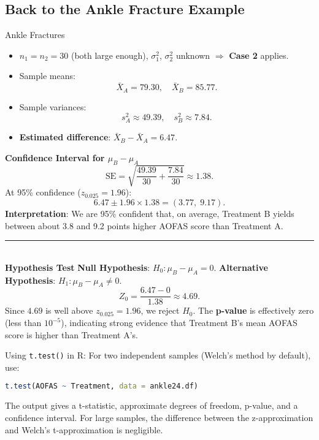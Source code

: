 \documentclass[10pt, total={6in, 8in}]{extarticle}
\begin{document}
\subsection{Back to the Ankle Fracture Example}
\begin{examplebox}{Ankle Fractures}{}
    \begin{itemize}
        \item $n_1 = n_2 = 30$ (both large enough), $\sigma_1^2$, $\sigma_2^2$ unknown $\Rightarrow$ \textbf{Case 2} applies.
        \item Sample means:
              $$
                  \bar{X}_A = 79.30,\quad \bar{X}_B = 85.77.
              $$
        \item Sample variances:
              $$
                  s_A^2 \approx 49.39,\quad s_B^2 \approx 7.84.
              $$
        \item \textbf{Estimated difference}: $\bar{X}_B - \bar{X}_A = 6.47$.
    \end{itemize}
    \textbf{Confidence Interval for $\mu_B - \mu_A$}
    $$
        \text{SE} = \sqrt{\frac{49.39}{30} + \frac{7.84}{30}} \approx 1.38.
    $$
    At 95\% confidence ($z_{0.025}=1.96$):
    $$
        6.47 \pm 1.96 \times 1.38 = (3.77,\; 9.17).
    $$
    \textbf{Interpretation}: We are 95\% confident that, on average, Treatment B yields between about 3.8 and 9.2 points higher AOFAS score than Treatment A.

    \noindent\rule{\textwidth}{1pt} \\ [2ex]
    \textbf{Hypothesis Test}
    \textbf{Null Hypothesis}: $H_0 : \mu_B - \mu_A = 0$.
    \textbf{Alternative Hypothesis}: $H_1 : \mu_B - \mu_A \neq 0$.
    $$
        Z_0 = \frac{6.47 - 0}{1.38} \approx 4.69.
    $$
    Since $4.69$ is well above $z_{0.025}=1.96$, we reject $H_0$. The \textbf{p-value} is effectively zero (less than $10^{-5}$), indicating strong evidence that Treatment B's mean AOFAS score is higher than Treatment A's.
\end{examplebox}
\begin{conceptbox}{Using \texttt{t.test()} in R:}{}
    For two independent samples (Welch's method by default), use:
    \begin{lstlisting}[language=r]
    t.test(AOFAS ~ Treatment, data = ankle24.df)
    \end{lstlisting}
    The output gives a t-statistic, approximate degrees of freedom, p-value, and a confidence interval. For large samples, the difference between the z-approximation and Welch's t-approximation is negligible.
\end{conceptbox}
\end{document}
